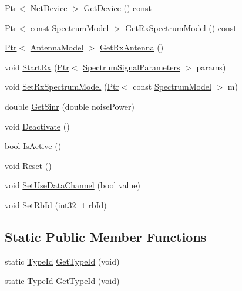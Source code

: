 \begin{DoxyCompactItemize}
\item 
\hyperlink{classns3_1_1Ptr}{Ptr}$<$ \hyperlink{classns3_1_1NetDevice}{Net\+Device} $>$ \hyperlink{classns3_1_1RemSpectrumPhy_a39ef23e98d1898ccb65f10ef43b5f1e5}{Get\+Device} () const 
\item 
\hyperlink{classns3_1_1Ptr}{Ptr}$<$ const \hyperlink{classns3_1_1SpectrumModel}{Spectrum\+Model} $>$ \hyperlink{classns3_1_1RemSpectrumPhy_a02c09ec7b9e7a9f2a77ec070b40657db}{Get\+Rx\+Spectrum\+Model} () const 
\item 
\hyperlink{classns3_1_1Ptr}{Ptr}$<$ \hyperlink{classns3_1_1AntennaModel}{Antenna\+Model} $>$ \hyperlink{classns3_1_1RemSpectrumPhy_a07f1c47998f4fc141c9d64cf3233cb76}{Get\+Rx\+Antenna} ()
\item 
void \hyperlink{classns3_1_1RemSpectrumPhy_a9ddd325516aae88f04bd688c08a27e0d}{Start\+Rx} (\hyperlink{classns3_1_1Ptr}{Ptr}$<$ \hyperlink{structns3_1_1SpectrumSignalParameters}{Spectrum\+Signal\+Parameters} $>$ params)
\item 
void \hyperlink{classns3_1_1RemSpectrumPhy_aa5f69cafa4dbbea74b66d552a2dfdd82}{Set\+Rx\+Spectrum\+Model} (\hyperlink{classns3_1_1Ptr}{Ptr}$<$ const \hyperlink{classns3_1_1SpectrumModel}{Spectrum\+Model} $>$ m)
\item 
double \hyperlink{classns3_1_1RemSpectrumPhy_a1835a26b78604605824ca016575356d2}{Get\+Sinr} (double noise\+Power)
\item 
void \hyperlink{classns3_1_1RemSpectrumPhy_a514eba9cfa0d52031036bee6b71d4f58}{Deactivate} ()
\item 
bool \hyperlink{classns3_1_1RemSpectrumPhy_a24f74606d67b49246c70ee32a2ecf1bf}{Is\+Active} ()
\item 
void \hyperlink{classns3_1_1RemSpectrumPhy_a4880d01719192d6c8392ad6ab1e4732d}{Reset} ()
\item 
void \hyperlink{classns3_1_1RemSpectrumPhy_ad4a39b25e22449e590aeea10ba2ff03d}{Set\+Use\+Data\+Channel} (bool value)
\item 
void \hyperlink{classns3_1_1RemSpectrumPhy_a8f4467027537234114aaf8c7cf9a7065}{Set\+Rb\+Id} (int32\+\_\+t rb\+Id)
\end{DoxyCompactItemize}
\subsection*{Static Public Member Functions}
\begin{DoxyCompactItemize}
\item 
static \hyperlink{classns3_1_1TypeId}{Type\+Id} \hyperlink{classns3_1_1RemSpectrumPhy_ac0b7ec25e303a055d779da444391f007}{Get\+Type\+Id} (void)
\item 
static \hyperlink{classns3_1_1TypeId}{Type\+Id} \hyperlink{classns3_1_1RemSpectrumPhy_ae65e983eabd51f13fa8cdf112799159f}{Get\+Type\+Id} (void)
\end{DoxyCompactItemize}
